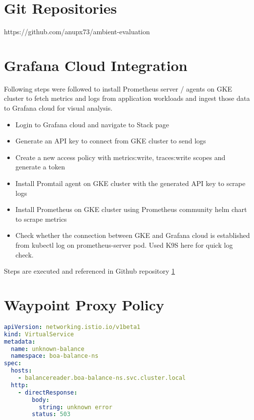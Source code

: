 \appendix

\section{Git Repositories}
\label{appendix:researchRepo}
https://github.com/anupx73/ambient-evaluation


\section{Grafana Cloud Integration}
\label{appendix:grafana}
Following steps were followed to install Prometheus server / agents on GKE cluster to fetch metrics and logs from application workloads and ingest those data to Grafana cloud for visual analysis. 

\begin{itemize}
\item Login to Grafana cloud and navigate to Stack page
\item Generate an API key to connect from GKE cluster to send logs
\item Create a new access policy with metrics:write, traces:write scopes and generate a token
\item Install Promtail agent on GKE cluster with the generated API key to scrape logs
\item Install Prometheus on GKE cluster using Prometheus community helm chart to scrape metrics
\item Check whether the connection between GKE and Grafana cloud is established from kubectl log on prometheus-server pod. Used K9S here for quick log check.
\end{itemize}

Steps are executed and referenced in Github repository \ref{appendix:researchRepo}

\section{Waypoint Proxy Policy}
\label{appendix:waypoint}

\begin{lstlisting}[language=yaml]
apiVersion: networking.istio.io/v1beta1
kind: VirtualService
metadata:
  name: unknown-balance
  namespace: boa-balance-ns
spec:
  hosts:
    - balancereader.boa-balance-ns.svc.cluster.local
  http:
    - directResponse:
        body:
          string: unknown error
        status: 503
\end{lstlisting}
